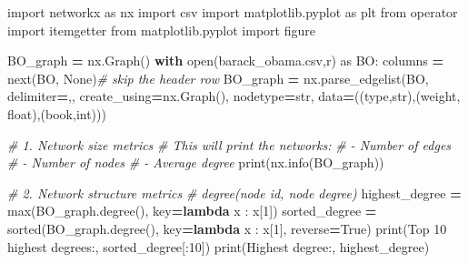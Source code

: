 \documentclass[
]{article}
\newenvironment{Shaded}{\begin{snugshade}}{\end{snugshade}}
\newcommand{\BuiltInTok}[1]{#1}
\newcommand{\CommentTok}[1]{\textcolor[rgb]{0.56,0.35,0.01}{\textit{#1}}}
\newcommand{\ControlFlowTok}[1]{\textcolor[rgb]{0.13,0.29,0.53}{\textbf{#1}}}
\newcommand{\DecValTok}[1]{\textcolor[rgb]{0.00,0.00,0.81}{#1}}
\newcommand{\ImportTok}[1]{#1}
\newcommand{\KeywordTok}[1]{\textcolor[rgb]{0.13,0.29,0.53}{\textbf{#1}}}
\newcommand{\NormalTok}[1]{#1}
\newcommand{\OperatorTok}[1]{\textcolor[rgb]{0.81,0.36,0.00}{\textbf{#1}}}
\newcommand{\StringTok}[1]{\textcolor[rgb]{0.31,0.60,0.02}{#1}}
\newcommand{\VariableTok}[1]{\textcolor[rgb]{0.00,0.00,0.00}{#1}}
\begin{document}
\begin{Shaded}
\begin{Highlighting}[]
\ImportTok{import}\NormalTok{ networkx }\ImportTok{as}\NormalTok{ nx}
\ImportTok{import}\NormalTok{ csv}
\ImportTok{import}\NormalTok{ matplotlib.pyplot }\ImportTok{as}\NormalTok{ plt}
\ImportTok{from}\NormalTok{ operator }\ImportTok{import}\NormalTok{ itemgetter}
\ImportTok{from}\NormalTok{ matplotlib.pyplot }\ImportTok{import}\NormalTok{ figure}

\NormalTok{BO\_graph }\OperatorTok{=}\NormalTok{ nx.Graph()}
\ControlFlowTok{with} \BuiltInTok{open}\NormalTok{(}\StringTok{\textquotesingle{}barack\_obama.csv\textquotesingle{}}\NormalTok{,}\StringTok{\textquotesingle{}r\textquotesingle{}}\NormalTok{) }\ImportTok{as}\NormalTok{ BO:}
\NormalTok{  columns }\OperatorTok{=} \BuiltInTok{next}\NormalTok{(BO, }\VariableTok{None}\NormalTok{)}\CommentTok{\# skip the header row}
\NormalTok{  BO\_graph }\OperatorTok{=}\NormalTok{ nx.parse\_edgelist(BO, delimiter}\OperatorTok{=}\StringTok{\textquotesingle{},\textquotesingle{}}\NormalTok{, create\_using}\OperatorTok{=}\NormalTok{nx.Graph(),}
\NormalTok{    nodetype}\OperatorTok{=}\BuiltInTok{str}\NormalTok{, data}\OperatorTok{=}\NormalTok{((}\StringTok{\textquotesingle{}type\textquotesingle{}}\NormalTok{,}\BuiltInTok{str}\NormalTok{),(}\StringTok{\textquotesingle{}weight\textquotesingle{}}\NormalTok{, }\BuiltInTok{float}\NormalTok{),(}\StringTok{\textquotesingle{}book\textquotesingle{}}\NormalTok{,}\BuiltInTok{int}\NormalTok{)))}

\CommentTok{\# 1. Network size metrics}
\CommentTok{\# This will print the network\textquotesingle{}s:}
\CommentTok{\# {-} Number of edges}
\CommentTok{\# {-} Number of nodes}
\CommentTok{\# {-} Average degree}
\BuiltInTok{print}\NormalTok{(nx.info(BO\_graph))}

\CommentTok{\# 2. Network structure metrics}
\CommentTok{\# degree(\textquotesingle{}node id\textquotesingle{}, node degree)}
\NormalTok{highest\_degree }\OperatorTok{=} \BuiltInTok{max}\NormalTok{(BO\_graph.degree(), key}\OperatorTok{=}\KeywordTok{lambda}\NormalTok{ x : x[}\DecValTok{1}\NormalTok{])}
\NormalTok{sorted\_degree }\OperatorTok{=} \BuiltInTok{sorted}\NormalTok{(BO\_graph.degree(), key}\OperatorTok{=}\KeywordTok{lambda}\NormalTok{ x : x[}\DecValTok{1}\NormalTok{], reverse}\OperatorTok{=}\VariableTok{True}\NormalTok{)}
\BuiltInTok{print}\NormalTok{(}\StringTok{\textquotesingle{}Top 10 highest degrees:\textquotesingle{}}\NormalTok{, sorted\_degree[:}\DecValTok{10}\NormalTok{])}
\BuiltInTok{print}\NormalTok{(}\StringTok{\textquotesingle{}Highest degree:\textquotesingle{}}\NormalTok{, highest\_degree)}


\end{Highlighting}
\end{Shaded}
\end{document}
